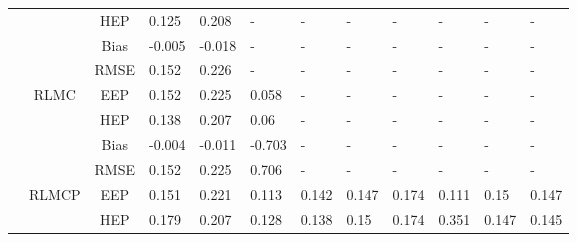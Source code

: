 \documentclass[10pt, a4paper]{article}
\begin{document}
\begin{longtable}[t]{lcclllllllll}
                                                                                                                                &                       & HEP   & 0.125     & 0.208	    & -	        & -	        & -	        & -	        & -	        & -	        & -         \\
                                                                                                                                &                       & Bias  & -0.005    & -0.018	& -	        & -	        & -	        & -	        & -	        & -	        & -         \\
                                                                                                                                &                       & RMSE  & 0.152     & 0.226	    & -	        & -	        & -	        & -	        & -	        & -	        & -         \\ \cline{2-12} 
                                                                                                                                & \multirow{4}{*}{RLMC} & EEP   & 0.152     & 0.225	    & 0.058	    & -	        & -	        & -	        & -	        & -	        & -         \\ 
                                                                                                                                &                       & HEP   & 0.138     & 0.207	    & 0.06	    & -	        & -	        & -	        & -	        & -	        & -         \\ 
                                                                                                                                &                       & Bias  & -0.004    & -0.011	& -0.703	& -	        & -	        & -	        & -	        & -	        & -         \\ 
                                                                                                                                &                       & RMSE  & 0.152     & 0.225	    & 0.706	    & -	        & -	        & -	        & -	        & -	        & -         \\ \cline{2-12}
                                                                                                                                & \multirow{4}{*}{RLMCP}& EEP   & 0.151     & 0.221	    & 0.113	    & 0.142	    & 0.147	    & 0.174	    & 0.111     & 0.15      & 0.147     \\
                                                                                                                                &                       & HEP   & 0.179     & 0.207	    & 0.128	    & 0.138	    & 0.15	    & 0.174	    & 0.351     & 0.147     & 0.145     \\

\end{longtable}
\end{document}
